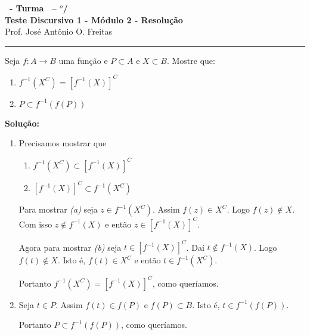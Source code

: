 \documentclass[12pt]{exam}
\begin{document}
	\begin{center}
	{\Large\bf \disciplina\ - Turma \turma\ -- \semestre$^{o}$/\ano} \\ \vspace{9pt} {\large\bf
	Teste Discursivo 1 - M\'odulo 2 - Resolu\c{c}\~ao}\\
	\vspace{9pt} Prof. Jos{\'e} Ant{\^o}nio O. Freitas
	\end{center}
	\hrule

	\vspace{.6cm}

	Seja $f : A \to B$ uma função e $P \subset A$ e $X \subset B$. Mostre que:
	\begin{enumerate}[label={\arabic*})]
		\item $f^{-1}(X^C) = [f^{-1}(X)]^C$

		\item $P \subset f^{-1}(f(P))$
	\end{enumerate}

	\noindent\textbf{Solu\c{c}\~ao:}

	\begin{enumerate}[label={\arabic*})]
		\item Precisamos mostrar que
		\begin{enumerate}
			\item $f^{-1}(X^C) \subset [f^{-1}(X)]^C$

			\item $[f^{-1}(X)]^C \subset f^{-1}(X^C)$
		\end{enumerate}

		Para mostrar \textit{(a)} seja $z \in f^{-1}(X^C)$. Assim $f(z) \in X^C$. Logo $f(z) \notin	X$. Com isso $z \notin f^{-1}(X)$ e então $z \in [f^{-1}(X)]^C$.

		Agora para mostrar \textit{(b)} seja $t \in [f^{-1}(X)]^C$. Daí $t \notin f^{-1}(X)$. Logo $f(t) \notin X$. Isto é, $f(t) \in X^C$ e então $t \in f^{-1}(X^C)$.

		Portanto $f^{-1}(X^C) = [f^{-1}(X)]^C$, como queríamos.

		\item Seja $t \in P$. Assim $f(t) \in f(P)$ e $f(P) \subset B$. Isto é, $t \in f^{-1}(f(P))$.

		Portanto $P \subset f^{-1}(f(P))$, como queríamos.
	\end{enumerate}
\end{document}
